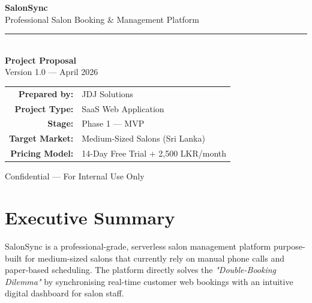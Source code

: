\documentclass[12pt,a4paper]{report}
\begin{document}
\begin{titlepage}
  \pagecolor{primary}
  \color{white}
  \centering
  \vspace*{3cm}

  {\fontsize{52}{60}\selectfont\bfseries Salon\textcolor{accent}{Sync}}\\[0.5cm]
  {\Large\color{midgray} Professional Salon Booking \& Management Platform}\\[2cm]

  {\color{accent}\rule{10cm}{1.5pt}}\\[1.5cm]

  {\large\bfseries Project Proposal}\\[0.3cm]
  {\normalsize Version 1.0 — April 2026}\\[2cm]

  \begin{tabular}{rl}
    \textbf{Prepared by:}  & JDJ Solutions                        \\[4pt]
    \textbf{Project Type:} & SaaS Web Application                 \\[4pt]
    \textbf{Stage:}        & Phase 1 — MVP                        \\[4pt]
    \textbf{Target Market:}& Medium-Sized Salons (Sri Lanka)      \\[4pt]
    \textbf{Pricing Model:}& 14-Day Free Trial + 2,500 LKR/month  \\
  \end{tabular}

  \vfill
  {\small\color{midgray} Confidential — For Internal Use Only}
\end{titlepage}

\pagecolor{white}\color{black}

\tableofcontents
\thispagestyle{empty}
\newpage

\chapter{Executive Summary}

SalonSync is a professional-grade, serverless salon management platform purpose-built
for medium-sized salons that currently rely on manual phone calls and paper-based
scheduling. The platform directly solves the \textit{"Double-Booking Dilemma"} by
synchronising real-time customer web bookings with an intuitive digital dashboard
for salon staff.
\end{document}
